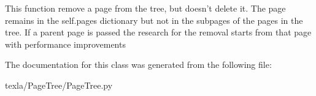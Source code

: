 \begin{DoxyVerb}This function remove a page from the tree,
but doesn't delete it. The page remains in the self.pages
dictionary but not in the subpages of the pages in the tree.
If a parent page is passed the research for the removal
starts from that page with performance improvements\end{DoxyVerb}
 

The documentation for this class was generated from the following file\+:\begin{DoxyCompactItemize}
\item 
texla/\+Page\+Tree/Page\+Tree.\+py\end{DoxyCompactItemize}
